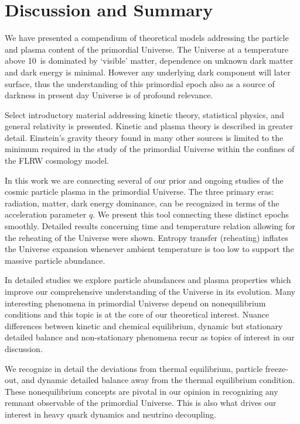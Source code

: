 \section{Discussion and Summary}\label{part6}
We have presented a compendium of theoretical models addressing the particle and plasma content of the  primordial Universe. The Universe at a temperature above 10\keV\ is dominated by `visible' matter, dependence on unknown dark matter and dark energy is minimal. However any underlying dark component will later surface, thus the understanding of this primordial epoch also as a source of darkness in present day Universe is of profound relevance.

Select introductory material addressing kinetic theory, statistical physics, and general relativity is presented. Kinetic and plasma theory is described in greater detail. Einstein's gravity theory found in many other sources is limited to the minimum required in the study of the primordial Universe within the confines of the FLRW cosmology model. 

In this work we are connecting several of our prior and ongoing studies of the cosmic particle plasma in the primordial Universe. The three primary  eras: radiation, matter, dark energy dominance, can be recognized in terms of the acceleration parameter $q$. We present this tool connecting these distinct epochs smoothly. Detailed results concerning time and temperature relation allowing for the reheating of the Universe were shown. Entropy transfer (reheating) inflates the Universe expansion whenever ambient temperature is too low to support the massive particle abundance.

In detailed studies we explore particle abundances and plasma properties which improve our comprehensive understanding of the Universe in its evolution. Many interesting phenomena in primordial Universe depend on nonequilibrium conditions and this topic is at the core of our theoretical interest. Nuance differences between kinetic and chemical equilibrium, dynamic but stationary detailed balance and non-stationary phenomena recur as topics of interest in our discussion. 

We recognize in detail the deviations from thermal equilibrium, particle freeze-out, and dynamic detailed balance away from the thermal equilibrium condition. These nonequilibrium concepts are pivotal in our opinion in recognizing any remnant observable of the primordial Universe. This is also what drives our interest in heavy quark dynamics and neutrino decoupling. 

